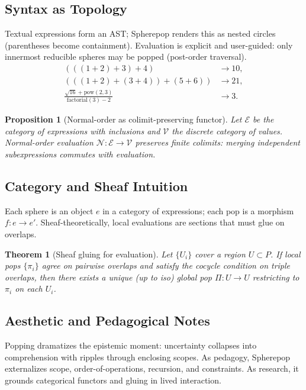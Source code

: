 \documentclass[12pt]{article}
\newtheorem{proposition}{Proposition}
\newtheorem{theorem}{Theorem}
\begin{document}
\subsection{Syntax as Topology}
Textual expressions form an AST; Spherepop renders this as nested circles (parentheses become containment). Evaluation is explicit and user-guided: only innermost reducible spheres may be popped (post-order traversal).
\begin{align}
(((1+2)+3)+4) &\to 10,\\
(((1+2)+(3+4))+(5+6)) &\to 21,\\
\frac{\sqrt{16}+\mathrm{pow}(2,3)}{\mathrm{factorial}(3)-2} &\to 3.
\end{align}

\begin{proposition}[Normal-order as colimit-preserving functor]
Let \(\mathcal{E}\) be the category of expressions with inclusions and \(\mathcal{V}\) the discrete category of values. Normal-order evaluation \(\mathcal{N}:\mathcal{E}\to\mathcal{V}\) preserves finite colimits: merging independent subexpressions commutes with evaluation.
\end{proposition}

\subsection{Category and Sheaf Intuition}
Each sphere is an object \(e\) in a category of expressions; each pop is a morphism \(f:e\to e'\). Sheaf-theoretically, local evaluations are sections that must glue on overlaps.

\begin{theorem}[Sheaf gluing for evaluation]
Let \(\{U_i\}\) cover a region \(U\subset P\). If local pops \(\{\pi_i\}\) agree on pairwise overlaps and satisfy the cocycle condition on triple overlaps, then there exists a unique (up to iso) global pop \(\Pi:U\to U\) restricting to \(\pi_i\) on each \(U_i\).
\end{theorem}

\subsection{Aesthetic and Pedagogical Notes}
Popping dramatizes the epistemic moment: uncertainty collapses into comprehension with ripples through enclosing scopes. As pedagogy, Spherepop externalizes scope, order-of-operations, recursion, and constraints. As research, it grounds categorical functors and gluing in lived interaction.
\end{document}
